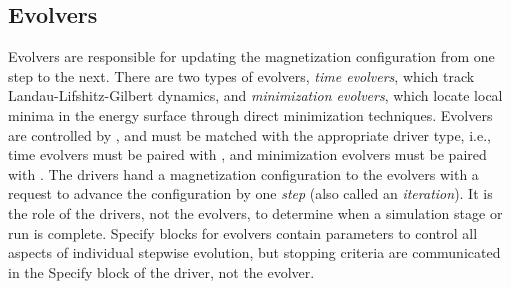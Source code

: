 \subsection{Evolvers\label{sec:oxsEvolvers}}
Evolvers are responsible for updating the magnetization configuration
from one step to the next.  There are two types of evolvers,
\textit{time evolvers}, which track Landau-Lifshitz-Gilbert dynamics,
and \textit{minimization evolvers}, which locate local minima in the
energy surface through direct minimization techniques.  Evolvers are
controlled by , and must be matched with the appropriate
driver type, i.e., time evolvers must be paired with
, and
minimization evolvers must be paired with .  The drivers hand a magnetization
configuration to the evolvers with a request to advance the
configuration by one \textit{step} (also called an \textit{iteration}).
It is the role of the drivers, not the evolvers, to determine when a
simulation stage or run is complete.  Specify blocks for evolvers
contain parameters to control all aspects of individual stepwise
evolution, but stopping criteria are communicated in the Specify block
of the driver, not the evolver.

